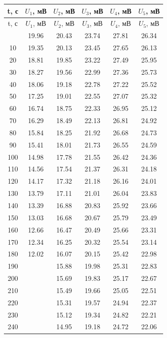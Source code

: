 \documentclass[a4paper, 12pt]{article}
\begin{document}
\begin{longtable}{|c|c|c|c|c|c|}
    \hline
    t, с & $U_1$, мВ & $U_2$, мВ & $U_3$, мВ & $U_4$, мВ & $U_5$, мВ \\ \hline
    \endfirsthead
    \hline
    t, с & $U_1$, мВ & $U_2$, мВ & $U_3$, мВ & $U_4$, мВ & $U_5$, мВ \\ \hline
    \endhead
    \hline
    \endfoot
    \hline
    \endlastfoot 
    0	& 19.96	& 20.43 & 23.74 & 27.81 & 26.34 \\
    10	& 19.35	& 20.13 & 23.45 & 27.65 & 26.13 \\
    20	& 18.81	& 19.85 & 23.22 & 27.49 & 25.95 \\
    30	& 18.27	& 19.56 & 22.99 & 27.36 & 25.73 \\
    40	& 18.06	& 19.18 & 22.78 & 27.22 & 25.52 \\
    50	& 17.25	& 19.01 & 22.55 & 27.07 & 25.32 \\
    60	& 16.74	& 18.75 & 22.33 & 26.95 & 25.12 \\
    70	& 16.29	& 18.49 & 22.13 & 26.81 & 24.92 \\
    80	& 15.84	& 18.25 & 21.92 & 26.68 & 24.73 \\
    90	& 15.41	& 18.01 & 21.73 & 26.55 & 24.59 \\
    100	& 14.98	& 17.78 & 21.55 & 26.42 & 24.36 \\
    110	& 14.56	& 17.54 & 21.37 & 26.31 & 24.18 \\
    120	& 14.17	& 17.32 & 21.18 & 26.16 & 24.01 \\
    130	& 13.79	& 17.11 & 21.01 & 26.04 & 23.83 \\
    140	& 13.39	& 16.88 & 20.83 & 25.92 & 23.66 \\
    150	& 13.03	& 16.68 & 20.67 & 25.79 & 23.49 \\
    160	& 12.66	& 16.47 & 20.49 & 25.66 & 23.31 \\
    170	& 12.34	& 16.25 & 20.32 & 25.54 & 23.14 \\
    180	& 12.02	& 16.07 & 20.15 & 25.42 & 22.98 \\
    190	&    ~  & 15.88 & 19.98 & 25.31 & 22.83 \\
    200	&    ~  & 15.69 & 19.83 & 25.17 & 22.67 \\
    210	&    ~  & 15.49 & 19.66 & 25.05 & 22.51 \\
    220	&    ~  & 15.31 & 19.57 & 24.94 & 22.37 \\
    230	&    ~  & 15.12 & 19.34 & 24.82 & 22.21 \\
    240	&    ~  & 14.95 & 19.18 & 24.72 & 22.06 \\

\end{longtable}
\end{document}
